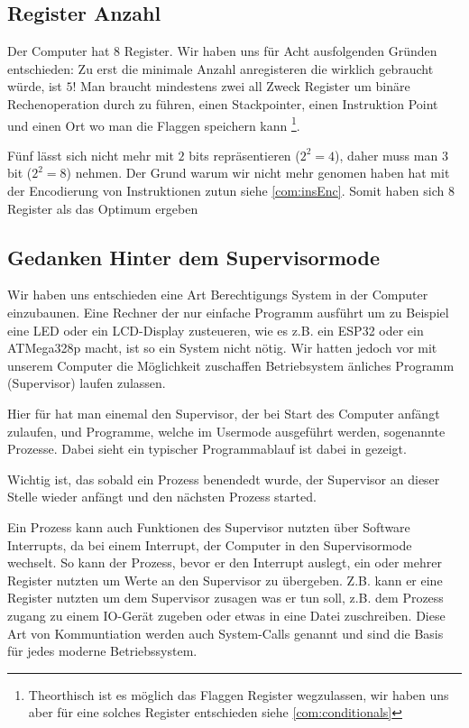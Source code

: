 \documentclass{scrartcl}
\begin{document}
\subsection{\label{section:comment:register_number}Register Anzahl}

Der Computer hat 8 Register. Wir haben uns für Acht ausfolgenden Gründen entschieden:
Zu erst die minimale Anzahl anregisteren die wirklich gebraucht würde, ist $5$! Man braucht mindestens zwei all Zweck Register um binäre Rechenoperation durch zu führen, einen Stackpointer, einen Instruktion Point und einen Ort wo man die Flaggen speichern kann
\footnote{Theorthisch ist es möglich das Flaggen Register wegzulassen, wir haben uns aber für eine solches Register entschieden siehe \autoref{com:conditionals}}.

Fünf lässt sich nicht mehr mit $2$ bits repräsentieren ($2^2 = 4$), daher muss man $3$ bit ($2^2 = 8$) nehmen. Der Grund warum wir nicht mehr genomen haben hat mit der Encodierung von Instruktionen zutun siehe \autoref{com:insEnc}. Somit haben sich $8$ Register als das Optimum ergeben

\subsection{\label{com:sup}Gedanken Hinter dem Supervisormode}

Wir haben uns entschieden eine Art Berechtigungs System in der Computer einzubaunen. Eine Rechner der nur einfache Programm ausführt um zu Beispiel eine LED oder ein LCD-Display zusteueren, wie es z.B. ein ESP32 oder ein ATMega328p macht, ist so ein System nicht nötig. Wir hatten jedoch vor mit unserem Computer die Möglichkeit zuschaffen Betriebsystem änliches Programm (Supervisor) laufen zulassen. 

Hier für hat man einemal den Supervisor, der bei Start des Computer anfängt zulaufen, und Programme, welche im Usermode ausgeführt werden, sogenannte Prozesse. Dabei sieht ein typischer Programmablauf ist dabei in gezeigt.



Wichtig ist, das sobald ein Prozess benendedt wurde, der Supervisor an dieser Stelle wieder anfängt und den nächsten Prozess started. 

Ein Prozess kann auch Funktionen des Supervisor nutzten über Software Interrupts, da bei einem Interrupt, der Computer in den Supervisormode wechselt. So kann der Prozess, bevor er den Interrupt auslegt, ein oder mehrer Register nutzten um Werte an den Supervisor zu übergeben. Z.B. kann er eine Register nutzten um dem Supervisor zusagen was er tun soll, z.B. dem Prozess zugang zu einem IO-Gerät zugeben oder etwas in eine Datei zuschreiben. Diese Art von Kommuntiation werden auch System-Calls genannt und sind die Basis für jedes moderne Betriebssystem.
\end{document}
